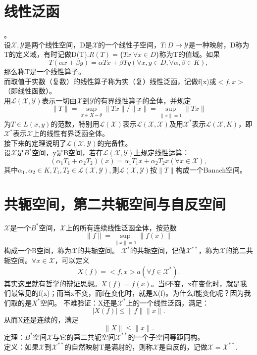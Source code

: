 \documentclass[a4paper,12pt]{article}
\begin{document}
\begin{CJK*}{UTF8}{gbsn}
	\section{线性泛函}
	\quad{}。\\
	设$\mathcal{X},\mathcal{Y}$是两个线性空间，D是$\mathcal{X}$的一个线性子空间，$T:D\to \mathcal{Y}$是一种映射，D称为T的定义域，有时记做D(T).$R(T) = \{ Tx | \forall x \in D\}$称为T的值域。如果
	$$T(\alpha x + \beta y) = \alpha Tx + \beta Ty (\forall x,y \in D,\forall \alpha,\beta \in K),$$
	那么称T是一个线性算子。\\
	而取值于实数（复数）的线性算子称为实（复）线性泛函，记做f(x)或$<f,x>$（即线性函数）。\\
	用$\mathcal{L}(\mathcal{X},\mathcal{Y})$表示一切由$\mathcal{X}$到$\mathcal{Y}$的有界线性算子的全体，并规定
	$$\|T\| = \sup_{x \in X - \theta}\|Tx\|/\|x\| = \sup_{\|x\|=1}\|Tx\|$$
	为$T \in L(x,y)$的范数，特别用$\mathcal{L}(\mathcal{X})$表示$\mathcal{L}(\mathcal{X},\mathcal{X})$及用$\mathcal{X}^*$表示$\mathcal{L}(\mathcal{X},K)$，即$\mathcal{X}^*$表示$\mathcal{X}$上的线性有界泛函全体。\\
	接下来的定理说明了$\mathcal{L}(\mathcal{X},\mathcal{Y})$的完备性。\\
	设$\mathcal{X}$是$B^*$空间，y是B空间，若在$\mathcal{L}(\mathcal{X},\mathcal{Y})$上规定线性运算：
	$$(\alpha_1 T_1 + \alpha_2 T_2)(x) = \alpha_1 T_1 x + \alpha_2 T_2 x (\forall x \in \mathcal{X}),$$
	其中$\alpha_1,\alpha_2 \in K, T_1,T_2\in \mathcal{L}(\mathcal{X},\mathcal{Y}),$则$\mathcal{L}(\mathcal{X},\mathcal{Y})$按$\|T\|$构成一个Banach空间。\\
	\section{共轭空间，第二共轭空间与自反空间}
	\quad{}$\mathcal{X}$是一个$B^*$空间，$\mathcal{X}$上的所有连续线性泛函全体，按范数
	$$\|f\| = \sup_{\|x\|=1}\|f(x)\|$$
	构成一个B空间，称为$\mathcal{X}$的共轭空间。
	$\mathcal{X}^*$的共轭空间，记做$\mathcal{X}^{**}$，称为$\mathcal{X}$的第二共轭空间。$\forall x \in \mathcal{X}$，可以定义
	$$X(f) = <f,x>a (\forall f \in \mathcal{X}^*).$$
	其实这里就有哲学的辩证思想。$X(f)=f(x)$。当f不变，x在变化时，就是我们最常见的f(x)；而当x不变，而f在变化时，就是X(f)。为什么f能变化呢？因为我们取的是$X^*$空间。
	不难验证：X还是$\mathcal{X}^*$上的一个线性泛函，满足：
	$$|X(f)| \le \|f\|\|x\|.$$
	从而X还是连续的，满足
	$$\|X\| \le \|x\|.$$
	定理：$B^*$空间$\mathcal{X}$与它的第二共轭空间$\mathcal{X}^{**}$的一个子空间等距同构。\\
	定义：如果$\mathcal{X}$到$\mathcal{X}^{**}$的自然映射T是满射的，则称$\mathcal{X}$是自反的，记做$\mathcal{X}=\mathcal{X}^{**}.$

\end{CJK*}
\end{document}

